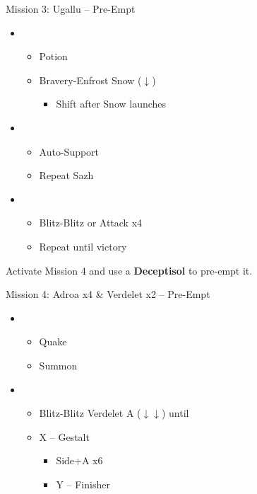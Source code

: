 \begin{battle}{Mission 3: Ugallu -- Pre-Empt}
	\begin{itemize}
		\item \third
			\begin{itemize}
				\item Potion
				\item Bravery-Enfrost Snow ($\downarrow$)
					\begin{itemize}
						\item Shift after Snow launches
					\end{itemize}
			\end{itemize}
		\item \fourth
			\begin{itemize}
				\item Auto-Support
				\item Repeat Sazh
			\end{itemize}
		\item \fifth
			\begin{itemize}
				\item Blitz-Blitz or Attack x4
				\item Repeat until victory
			\end{itemize}
	\end{itemize}
\end{battle}

Activate Mission 4 and use a \textbf{Deceptisol} to pre-empt it.
\vfill
\begin{battle}{Mission 4: Adroa x4 \& Verdelet x2 -- Pre-Empt}
	\begin{itemize}
		\item \third
			\begin{itemize}
				\item Quake
				\item Summon
			\end{itemize}
		\item \fifth
			\begin{itemize}
				\item Blitz-Blitz Verdelet A ($\downarrow\downarrow$) until \stagger
				\item X -- Gestalt
					\begin{itemize}
						\item Side+A x6
						\item Y -- Finisher
					\end{itemize}
			\end{itemize}
	\end{itemize}
\end{battle}


